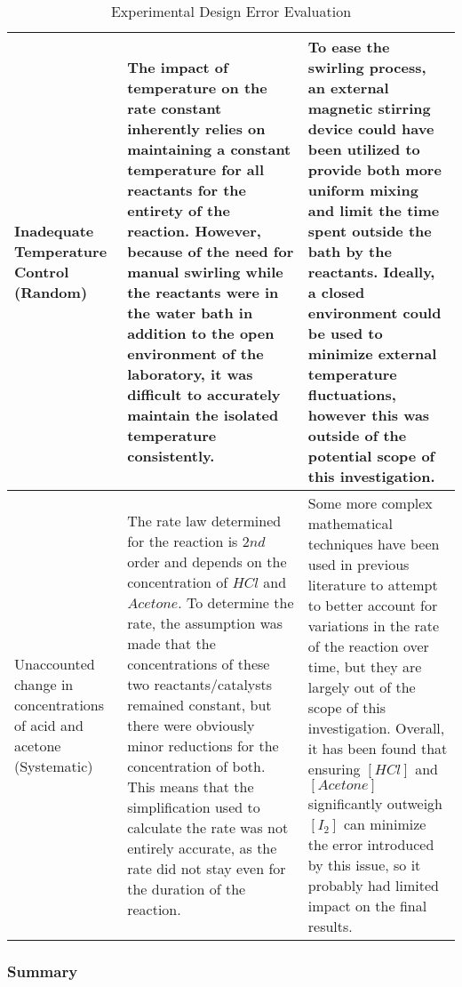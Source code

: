 \begin{table}[h!]
\begin{tabular}{|p{3cm}|p{7cm}|p{7cm}|}
 \hline
 Inadequate Temperature Control (Random) & The impact of temperature on the rate constant inherently relies on maintaining a constant temperature for all reactants for the entirety of the reaction. However, because of the need for manual swirling while the reactants were in the water bath in addition to the open environment of the laboratory, it was difficult to accurately maintain the isolated temperature consistently. &  To ease the swirling process, an external magnetic stirring device could have been utilized to provide both more uniform mixing and limit the time spent outside the bath by the reactants. Ideally, a closed environment could be used to minimize external temperature fluctuations, however this was outside of the potential scope of this investigation. \\
 \hline
  Unaccounted change in concentrations of acid and acetone (Systematic) & The rate law determined for the reaction is $2nd$ order and depends on the concentration of $HCl$ and $Acetone$. To determine the rate, the assumption was made that the concentrations of these two reactants/catalysts remained constant, but there were obviously minor reductions for the concentration of both. This means that the simplification used to calculate the rate was not entirely accurate, as the rate did not stay even for the duration of the reaction. &  Some more complex mathematical techniques have been used in previous literature to attempt to better account for variations in the rate of the reaction over time, but they are largely out of the scope of this investigation. Overall, it has been found that ensuring $[HCl]$ and $[Acetone]$ significantly outweigh $[I_2]$ can minimize the error introduced by this issue, so it probably had limited impact on the final results.\\
 \hline

\end{tabular}
\caption{Experimental Design Error Evaluation}
\label{table:experimental_design_error_evaluation}
\end{table}

\subsubsection{Summary}

